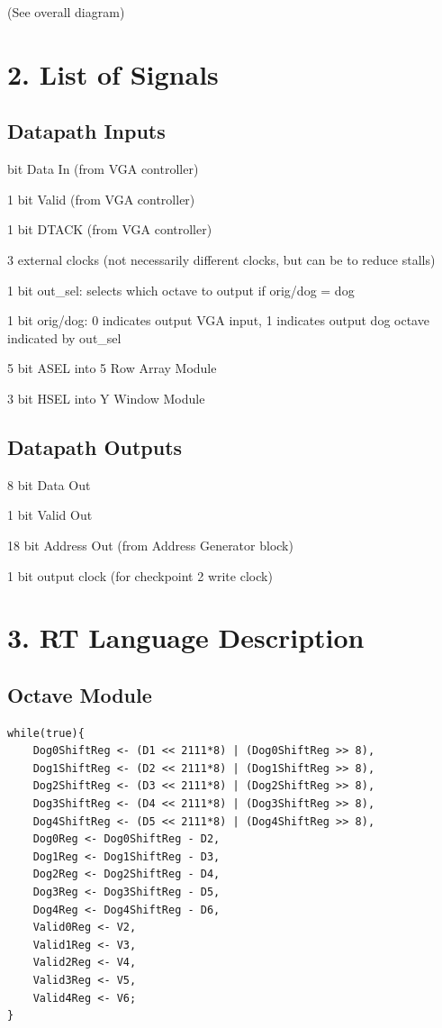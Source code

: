 \documentclass[11pt]{article}
\begin{document}
(See overall diagram)

\section*{2. List of Signals}

\subsection*{Datapath Inputs}

 bit Data In (from VGA controller)

1 bit Valid  (from VGA controller)

1 bit DTACK (from VGA controller)

3 external clocks (not necessarily different clocks, but can be to reduce stalls)

1 bit out\_sel: selects which octave to output if orig/dog = dog

1 bit orig/dog: 0 indicates output VGA input, 1 indicates output dog octave indicated by out\_sel

5 bit ASEL into 5 Row Array Module

3 bit HSEL into Y Window Module

\subsection*{Datapath Outputs}

8 bit Data Out

1 bit Valid Out

18 bit Address Out (from Address Generator block)

1 bit output clock (for checkpoint 2 write clock)

\section*{3. RT Language Description}

\subsection*{Octave Module}
\begin{lstlisting}
while(true){
    Dog0ShiftReg <- (D1 << 2111*8) | (Dog0ShiftReg >> 8),
    Dog1ShiftReg <- (D2 << 2111*8) | (Dog1ShiftReg >> 8),
    Dog2ShiftReg <- (D3 << 2111*8) | (Dog2ShiftReg >> 8),
    Dog3ShiftReg <- (D4 << 2111*8) | (Dog3ShiftReg >> 8),
    Dog4ShiftReg <- (D5 << 2111*8) | (Dog4ShiftReg >> 8),
    Dog0Reg <- Dog0ShiftReg - D2,
    Dog1Reg <- Dog1ShiftReg - D3,
    Dog2Reg <- Dog2ShiftReg - D4,
    Dog3Reg <- Dog3ShiftReg - D5,
    Dog4Reg <- Dog4ShiftReg - D6,
    Valid0Reg <- V2,
    Valid1Reg <- V3,
    Valid2Reg <- V4,
    Valid3Reg <- V5,
    Valid4Reg <- V6;
}
\end{lstlisting}
\end{document}
